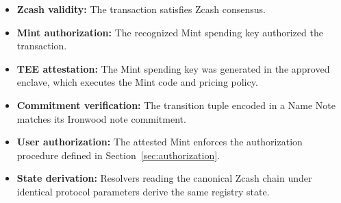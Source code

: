 \begin{itemize}
  \item \textbf{Zcash validity:} The transaction satisfies Zcash consensus.
  \item \textbf{Mint authorization:} The recognized Mint spending key authorized the transaction.
  \item \textbf{TEE attestation:} The Mint spending key was generated in the approved enclave, which executes the Mint code and pricing policy.
  \item \textbf{Commitment verification:} The transition tuple encoded in a Name Note matches its Ironwood note commitment.
  \item \textbf{User authorization:} The attested Mint enforces the authorization procedure defined in Section~\ref{sec:authorization}.
  \item \textbf{State derivation:} Resolvers reading the canonical Zcash chain under identical protocol parameters derive the same registry state.
\end{itemize}
